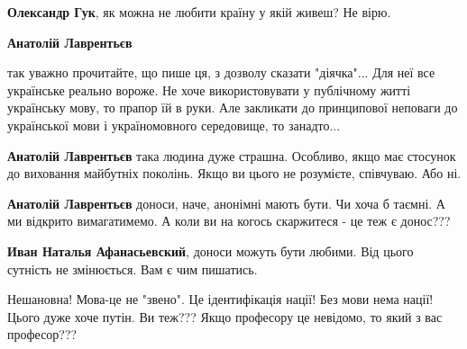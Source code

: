\begin{itemize}
\begin{itemize}
 
\textbf{Олександр Гук}, як можна не любити країну у якій живеш? Не вірю.

 

\textbf{Анатолій Лаврентьєв} 

так уважно прочитайте, що пише ця, з дозволу
сказати "діячка"... Для неї все українське реально вороже. Не хоче
використовувати у публічному житті українську мову, то прапор їй в руки. Але
закликати до принципової неповаги до української мови і україномовного
середовище, то занадто...

 
\textbf{Анатолій Лаврентьєв} така людина дуже страшна. Особливо, якщо має стосунок до виховання майбутніх поколінь. Якщо ви цього не розумієте, співчуваю. Або ні.

 
\textbf{Анатолій Лаврентьєв} доноси, наче, анонімні мають бути. Чи хоча б таємні. А ми відкрито вимагатимемо.
А коли ви на когось скаржитеся - це теж є донос???

 
\textbf{Иван Наталья Афанасьевский}, доноси можуть бути любими. Від цього сутність не змінюється. Вам є чим пишатись.

\end{itemize}

 
Нешановна! Мова-це не "звено". Це ідентифікація нації!
Без мови нема нації!
Цього дуже хоче путін. Ви теж???
Якщо професору це невідомо, то який з вас професор???


\end{itemize}
